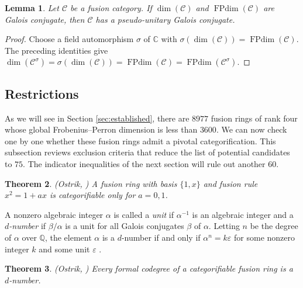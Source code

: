 \documentclass[11pt]{amsart}
\newtheorem{theorem}{Theorem}[section]
\newtheorem{lemma}[theorem]{Lemma}
\theoremstyle{definition}
\DeclareMathOperator{\FPdim}{FPdim}
\newcommand{\C}{\mathbb C}
\newcommand{\Q}{\mathbb Q}
\numberwithin{equation}{section}
\begin{document}
\begin{lemma}\label{lem:galois-reduction}
Let $\mathcal C$ be a fusion category.
If $\dim(\mathcal C)$ and $\FPdim(\mathcal C)$ are Galois conjugate,
then $\mathcal C$ has a pseudo-unitary Galois conjugate.
\end{lemma}
\begin{proof}
Choose a field automorphism $\sigma$ of $\C$ with $\sigma(\dim(\mathcal C))=\FPdim(\mathcal C)$.
The preceding identities give
$\dim(\mathcal C^\sigma)=\sigma(\dim(\mathcal C))=\FPdim(\mathcal C)=\FPdim(\mathcal C^\sigma)$.
\end{proof}

\subsection{Restrictions} \label{sub-sec2.4}
As we will see in Section \ref{sec:established}, there are $8977$ fusion rings of rank four whose global Frobenius--Perron dimension is less than $3600$. 
We can now check one by one whether these fusion rings admit a pivotal categorification. 
This subsection reviews exclusion criteria that reduce the list of potential candidates to $75$.
The indicator inequalities of the next section will rule out another $60$.

\begin{theorem} \label{prop:subring-Fibo} \textnormal{(Ostrik, \cite[Main Theorem, p.~178]{OstrikRank2})}
A fusion ring with basis $\{1,x\}$ and fusion rule $x^2=1+ax$ is
categorifiable only for $a=0,1$. 
\end{theorem}

A nonzero algebraic integer $\alpha$ is called a \textit{unit} if $\alpha^{-1}$ is an algebraic integer and a \textit{$d$-number} if $\beta/\alpha$ is a unit for all Galois conjugates $\beta$ of $\alpha$. 
Letting $n$ be the degree of $\alpha$ over $\Q$, the element $\alpha$ is a $d$-number if and only if $\alpha^n=k\varepsilon$ for some nonzero integer $k$ and some unit $\varepsilon$ \cite[Lemma~2.7(iv)]{OstrikCodegrees}. 

\begin{theorem} \label{prop:d-number} \textnormal{(Ostrik, \cite[Theorem~1.2]{OstrikCodegrees})}
Every formal codegree of a categorifiable fusion ring is a $d$-number. 
\end{theorem} 
\end{document}

